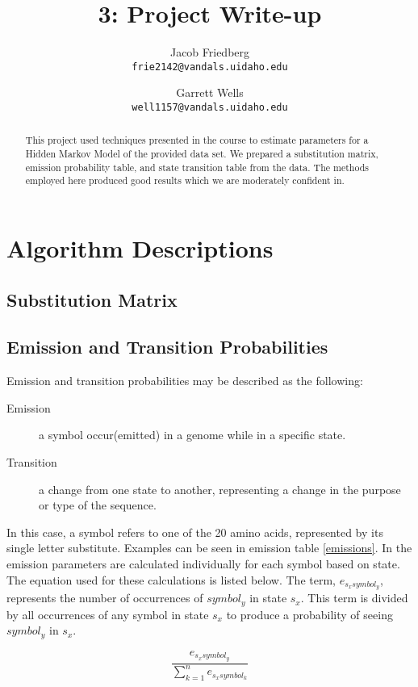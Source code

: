 \documentclass[a4paper,11pt]{article}
\title{3: Project Write-up}
\author{
Jacob Friedberg \\
\texttt{frie2142@vandals.uidaho.edu}
\and
Garrett Wells \\
\texttt{well1157@vandals.uidaho.edu}
}
\begin{document}
\maketitle
\begin{abstract}
    This project used techniques presented in the course to estimate parameters for a Hidden Markov Model of the provided data set. We prepared a substitution matrix, emission probability table, and state transition table from the data. The methods employed here produced good results which we are moderately confident in.
\end{abstract}

\section{Algorithm Descriptions}

\subsection{Substitution Matrix}

\subsection{Emission and Transition Probabilities}
Emission and transition probabilities may be described as the following:

\begin{description}
    \item[Emission] a symbol occur(emitted) in a genome while in a specific state.
    \item[Transition] a change from one state to another, representing a change in the purpose or type of the sequence.
\end{description}

In this case, a symbol refers to one of the 20 amino acids, represented by its single letter substitute. Examples can be seen in emission table \ref{emissions}. In the emission parameters are calculated individually for each symbol based on state. The equation used for these calculations is listed below. The term, $e_{s_{x}symbol_y}$, represents the number of occurrences of $symbol_y$ in state $s_x$. This term is divided by all occurrences of any symbol in state $s_x$ to produce a probability of seeing $symbol_y$ in $s_x$.

\begin{equation}
    \frac{e_{s_{x}symbol_y}}{\sum_{k=1}^n e_{s_xsymbol_k}}
\end{equation}
\end{document}
